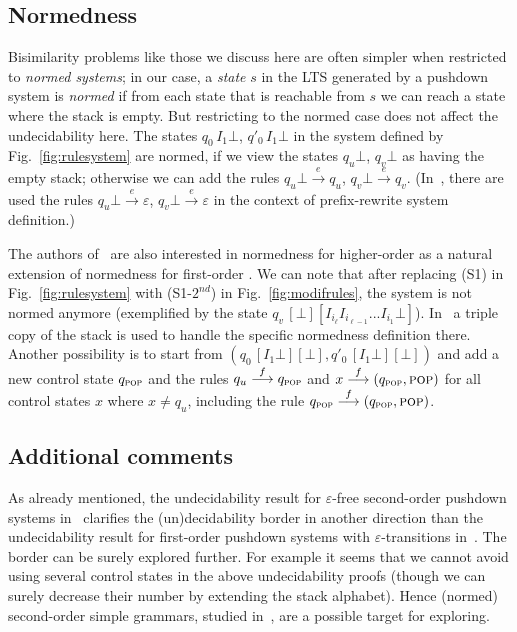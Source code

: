 \documentclass[11pt]{article}
\newcommand{\pop}{\textsc{pop}\xspace}
\newcommand{\pda}{\text{PDA}\xspace}
\newcommand{\goes}[1]{\ensuremath{\stackrel{#1}{\longrightarrow}}}
\begin{document}
\subsection{Normedness}

Bisimilarity problems like those we discuss here
are
often simpler when restricted to \emph{normed systems};
in our case, a \emph{state} $s$ in the LTS generated by  
a pushdown system is  \emph{normed} if from each
state that is reachable from $s$ we can reach 
a state where the stack is empty.
But restricting to the normed case does not affect the undecidability
here.
The states $q_0\, I_1\bot$, $q'_0\, I_1\bot$ in the system 
defined by
Fig.~\ref{fig:rulesystem} are normed, if 
we view the states $q_u\bot$, $q_v\bot$ as having the empty stack;
otherwise we can add
the rules
$q_u\bot \goes{e} q_u$,
$q_v\bot \goes{e} q_v$.
(In~\cite{DBLP:journals/jacm/JancarS08}, there are used
the rules $q_u\bot \goes{e} \varepsilon$,
$q_v\bot \goes{e} \varepsilon$ in the context 
of prefix-rewrite system definition.)

The authors of~\cite{DBLP:conf/fsttcs/BroadbentG12} 
are also interested in normedness for higher-order \pda as a natural extension of normedness for
first-order \pda.
We can note that after replacing (S1) in 
Fig.~\ref{fig:rulesystem}
with (S1-$2^{nd}$)
in Fig.~\ref{fig:modifrules}, the system is
not normed anymore 
(exemplified by the state
$q_v\,[\bot][I_{i_\ell}I_{i_{\ell-1}}...I_{i_1}\bot]$).
In~\cite{DBLP:conf/fsttcs/BroadbentG12} a triple
copy of the stack 
is used to handle the specific normedness definition there.
Another possibility is to start from
$(q_0\, [I_1\bot][\bot],q'_0\, [I_1\bot][\bot])$
and add a new control state $q_\textsc{pop}$ and
the rules $q_u \goes{f}q_\textsc{pop}$ and
$x \goes{f}(q_\textsc{pop},\pop)$ for all control states $x$
where $x \not=q_u$, 
including the rule $q_\textsc{pop}\goes{f}(q_\textsc{pop},\pop)$.

\subsection*{Additional comments}

As already mentioned, the undecidability result 
for $\varepsilon$-free 
second-order pushdown systems 
in~\cite{DBLP:conf/fsttcs/BroadbentG12}
clarifies the (un)decidability border in another direction 
than the undecidability result 
for first-order pushdown systems with $\varepsilon$-transitions
in~\cite{DBLP:journals/jacm/JancarS08}.
The border can be surely explored further. 
For example it seems that we cannot avoid 
using several control states in the above undecidability proofs
(though we can surely decrease their number 
by extending the stack alphabet).
Hence (normed) second-order simple grammars, 
studied in~\cite{DBLP:conf/concur/Stirling06}, 
are a possible target for exploring.









\end{document}
